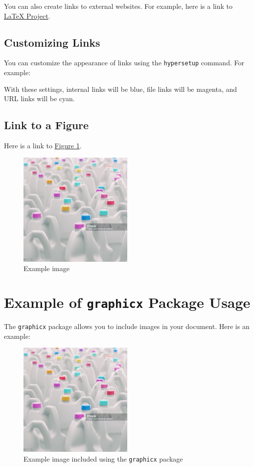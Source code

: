 \documentclass[]{article}
\begin{document}
You can also create links to external websites. For example, here is a link to \href{https://www.latex-project.org/}{LaTeX Project}.

\subsection{Customizing Links}

You can customize the appearance of links using the \texttt{hypersetup} command. For example:

\hypersetup{
    colorlinks=true,
    linkcolor=blue,
    filecolor=magenta,      
    urlcolor=cyan,
}

With these settings, internal links will be blue, file links will be magenta, and URL links will be cyan.

\subsection{Link to a Figure}

Here is a link to \hyperref[fig:example]{Figure 1}.

\begin{figure}[!ht]
    \centering
    \includegraphics[width=0.5\textwidth]{assets/example-image.jpg}
    \caption{Example image}
    \label{fig:example}
\end{figure}

\section{Example of \texttt{graphicx} Package Usage}

The \texttt{graphicx} package allows you to include images in your document. Here is an example:

\begin{figure}[!ht]
    \centering
    \includegraphics[width=0.5\textwidth]{assets/example-image.jpg}
    \caption{Example image included using the \texttt{graphicx} package}
    \label{fig:graphicx-example}
\end{figure}
\end{document}
